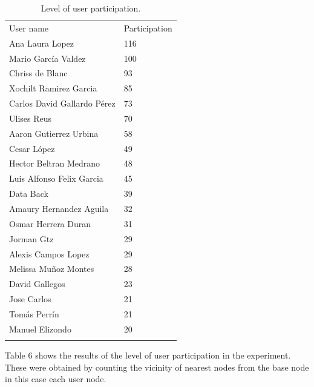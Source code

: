 \begin{table}
\small
\caption{Level of user participation.}
\label{tab:userParticipation_1} 
\centering
\small
\begin{tabular}{p{4cm} p{4cm}}
\hline\noalign{\smallskip}
 User name & Participation   \\
\noalign{\smallskip}\hline\noalign{\smallskip}
\small{Ana Laura Lopez} & \small{116} \\ \hline 
\small{Mario García Valdez} & \small{100} \\ \hline 
\small{Chriss de Blanc} & \small{93} \\ \hline 
\small{Xochilt Ramirez Garcia} & \small{85} \\ \hline 
\small{Carlos David Gallardo Pérez} & \small{73} \\ \hline 
\small{Ulises Reus} & \small{70} \\ \hline 
\small{Aaron Gutierrez Urbina} & \small{58} \\ \hline 
\small{Cesar López} & \small{49} \\ \hline 
\small{Hector Beltran Medrano} & \small{48} \\ \hline 
\small{Luis Alfonso Felix Garcia} & \small{45} \\ \hline 
\small{Data Back} & \small{39} \\ \hline 
\small{Amaury Hernandez Aguila} & \small{32} \\ \hline 
\small{Osmar Herrera Duran} & \small{31} \\ \hline
\small{Jorman Gtz} & \small{29} \\ \hline
\small{Alexis Campos Lopez} & \small{29} \\ \hline
\small{Melissa Muñoz Montes} & \small{28} \\ \hline
\small{David Gallegos} & \small{23} \\ \hline
\small{Jose Carlos} & \small{21} \\ \hline
\small{Tomás Perrín} & \small{21} \\ \hline
\small{Manuel Elizondo} & \small{20} \\ \hline

    
\noalign{\smallskip}\hline
\end{tabular}
\end{table}




Table 6 shows the results of the level of user participation in the experiment.
These were obtained by counting the vicinity of nearest nodes from the base node
in this case each user node.



